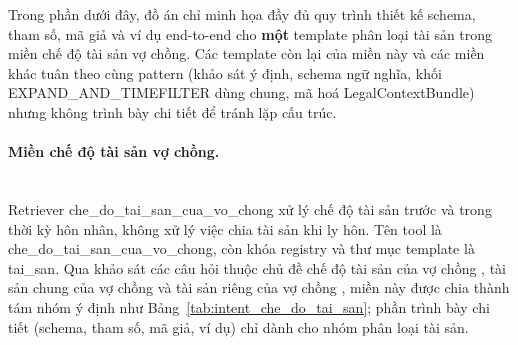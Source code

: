 \documentclass[../DoAn.tex]{subfiles}
\begin{document}
Trong phần dưới đây, đồ án chỉ minh họa đầy đủ quy trình thiết kế schema, tham số, mã giả và ví dụ end-to-end cho \textbf{một} template phân loại tài sản trong miền chế độ tài sản vợ chồng. Các template còn lại của miền này và các miền khác tuân theo cùng pattern (khảo sát ý định, schema ngữ nghĩa, khối EXPAND\_AND\_TIMEFILTER dùng chung, mã hoá LegalContextBundle) nhưng không trình bày chi tiết để tránh lặp cấu trúc.

\paragraph{Miền chế độ tài sản vợ chồng.}\mbox{}\\
Retriever che\_do\_tai\_san\_cua\_vo\_chong xử lý chế độ tài sản trước và trong thời kỳ hôn nhân, không xử lý việc chia tài sản khi ly hôn. Tên tool là che\_do\_tai\_san\_cua\_vo\_chong, còn khóa registry và thư mục template là tai\_san. Qua khảo sát các câu hỏi thuộc chủ đề chế độ tài sản của vợ chồng \cite{TVPLCheDoTaiSanVoChongDoc}, tài sản chung của vợ chồng \cite{TVPLTaiSanChungVoChongDoc} và tài sản riêng của vợ chồng \cite{TVPLTaiSanRiengVoChongDoc}, miền này được chia thành tám nhóm ý định như Bảng~\ref{tab:intent_che_do_tai_san}; phần trình bày chi tiết (schema, tham số, mã giả, ví dụ) chỉ dành cho nhóm phân loại tài sản.
\end{document}
